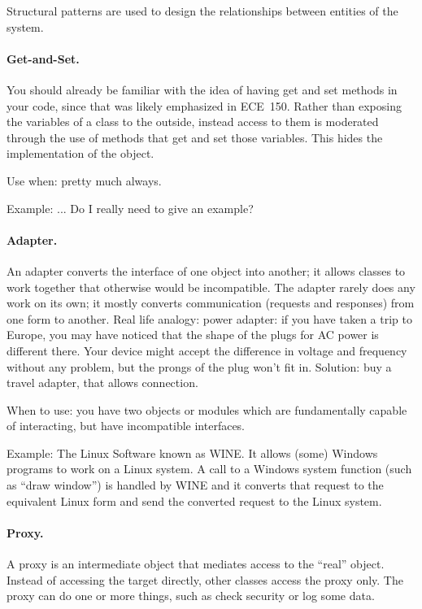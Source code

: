 Structural patterns are used to design the relationships between entities of the system.

\paragraph{Get-and-Set.}
You should already be familiar with the idea of having get and set methods in your code, since that was likely emphasized in ECE~150. Rather than exposing the variables of a class to the outside, instead access to them is moderated through the use of methods that get and set those variables. This hides the implementation of the object.

Use when: pretty much always.

Example: ... Do I really need to give an example?

\paragraph{Adapter.}
An adapter converts the interface of one object into another; it allows classes to work together that otherwise would be incompatible. The adapter rarely does any work on its own; it mostly converts communication (requests and responses) from one form to another. Real life analogy: power adapter: if you have taken a trip to Europe, you may have noticed that the shape of the plugs for AC power is different there. Your device might accept the difference in voltage and frequency without any problem, but the prongs of the plug won't fit in. Solution: buy a travel adapter, that allows connection.

When to use: you have two objects or modules which are fundamentally capable of interacting, but have incompatible interfaces.

Example: The Linux Software known as WINE. It allows (some) Windows programs to work on a Linux system. A call to a Windows system function (such as ``draw window'') is handled by WINE and it converts that request to the equivalent Linux form and send the converted request to the Linux system. 

\paragraph{Proxy.}
A proxy is an intermediate object that mediates access to the ``real'' object. Instead of accessing the target directly, other classes access the proxy only. The proxy can do one or more things, such as check security or log some data.


